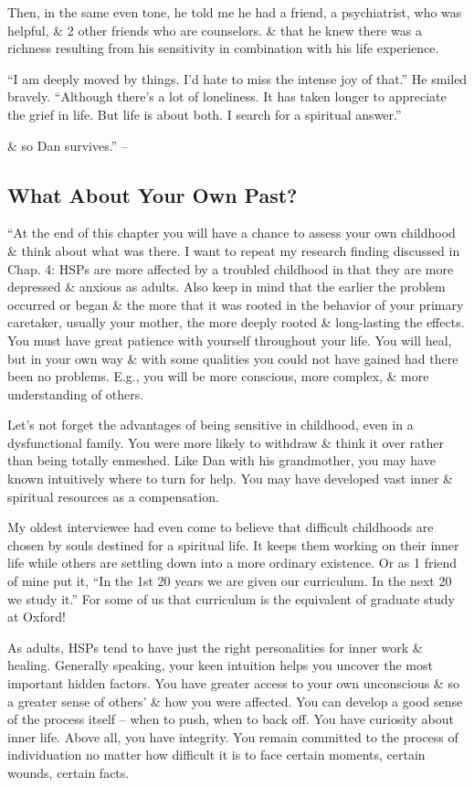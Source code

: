 \documentclass{article}
\numberwithin{equation}{section}
\begin{document}
Then, in the same even tone, he told me he had a friend, a psychiatrist, who was helpful, \& 2 other friends who are counselors. \& that he knew there was a richness resulting from his sensitivity in combination with his life experience.

``I am deeply moved by things. I'd hate to miss the intense joy of that.'' He smiled bravely. ``Although there's a lot of loneliness. It has taken longer to appreciate the grief in life. But life is about both. I search for a spiritual answer.''

\& so Dan survives.'' -- \cite[pp. 201--203]{Aron2013}

\subsection{What About Your Own Past?}
``At the end of this chapter you will have a chance to assess your own childhood \& think about what was there. I want to repeat my research finding discussed in Chap. 4: HSPs are more affected by a troubled childhood in that they are more depressed \& anxious as adults. Also keep in mind that the earlier the problem occurred or began \& the more that it was rooted in the behavior of your primary caretaker, usually your mother, the more deeply rooted \& long-lasting the effects. You must have great patience with yourself throughout your life. You will heal, but in your own way \& with some qualities you could not have gained had there been no problems. E.g., you will be more conscious, more complex, \& more understanding of others.

Let's not forget the advantages of being sensitive in childhood, even in a dysfunctional family. You were more likely to withdraw \& think it over rather than being totally enmeshed. Like Dan with his grandmother, you may have known intuitively where to turn for help. You may have developed vast inner \& spiritual resources as a compensation.

My oldest interviewee had even come to believe that difficult childhoods are chosen by souls destined for a spiritual life. It keeps them working on their inner life while others are settling down into a more ordinary existence. Or as 1 friend of mine put it, ``In the 1st 20 years we are given our curriculum. In the next 20 we study it.'' For some of us that curriculum is the equivalent of graduate study at Oxford!

As adults, HSPs tend to have just the right personalities for inner work \& healing. Generally speaking, your keen intuition helps you uncover the most important hidden factors. You have greater access to your own unconscious \& so a greater sense of others' \& how you were affected. You can develop a good sense of the process itself -- when to push, when to back off. You have curiosity about inner life. Above all, you have integrity. You remain committed to the process of individuation no matter how difficult it is to face certain moments, certain wounds, certain facts.
\end{document}
